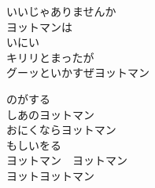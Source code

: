 \documentclass[10pt,b5j]{tarticle} %
\begin{document}
\begin{enumerate}
\begin{minipage}[c]{\blocksize}
        \vspace{\linespace}
        \item
        いいじゃありませんか\\
        ヨットマンは\\
        いにい\\
        キリリとまったが\\
        グーッといかすぜヨットマン
        
        \vspace{\linespace}
        \item
        のがする\\
        しあのヨットマン\\
        おにくならヨットマン\\
        もしいをる\\
        ヨットマン　ヨットマン\\
        ヨットヨットマン
    
    \end{minipage}
\end{enumerate} %
\end{document}
